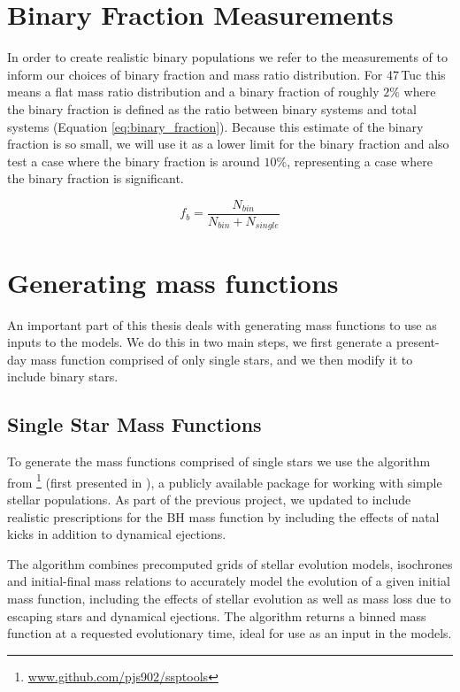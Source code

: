 \section{Binary Fraction Measurements}

In order to create realistic binary populations we refer to the measurements of \citet{Milone2012}
to inform our choices of binary fraction and mass ratio distribution. For 47\,Tuc this means a flat
mass ratio distribution and a binary fraction of roughly $2\%$ where the binary fraction is defined
as the ratio between binary systems and total systems (Equation \ref{eq:binary_fraction}). Because this estimate of the
binary fraction is so small, we will use it as a lower limit for the binary fraction and also test a
case where the binary fraction is around $10\%$, representing a case where the binary fraction is
significant.

\begin{equation}
    f_b = \frac{N_{bin}}{N_{bin} + N_{single}}
    \label{eq:binary_fraction}
\end{equation}


\section{Generating mass functions}

An important part of this thesis deals with generating mass functions to use as inputs to the
 models. We do this in two main steps, we first generate a present-day mass function
comprised of only single stars, and we then modify it to include binary stars.

\subsection{Single Star Mass Functions}


To generate the mass functions comprised of single stars we use the \evolvemf{} algorithm from
\footnote{\url{www.github.com/pjs902/ssptools}} (first presented in
\citealt{Balbinot2018}), a publicly available package for working with simple stellar populations.
As part of the previous project, we updated \evolvemf{} to include realistic prescriptions for the BH
mass function by including the effects of natal kicks in addition to dynamical ejections.

The \evolvemf{} algorithm combines precomputed grids of stellar evolution models, isochrones and
initial-final mass relations to accurately model the evolution of a given initial mass function,
including the effects of stellar evolution as well as mass loss due to escaping stars and dynamical
ejections. The algorithm returns a binned mass function at a requested evolutionary time, ideal for
use as an input in the  models.

